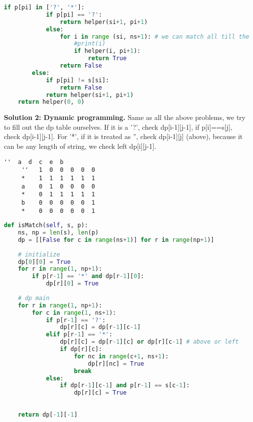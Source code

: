 \documentclass[../main.tex]{subfiles}
\begin{document}
\begin{examples}[resume]
\begin{lstlisting}[language=Python]
        if p[pi] in ['?', '*']: 
            if p[pi] == '?':
                return helper(si+1, pi+1)
            else:
                for i in range (si, ns+1): # we can match all till the end
                    #print(i)
                    if helper(i, pi+1):
                        return True
                return False
        else:
            if p[pi] != s[si]:
                return False
            return helper(si+1, pi+1)
    return helper(0, 0)
\end{lstlisting}

\textbf{Solution 2: Dynamic programming.} Same as all the above problems, we try to fill out the dp table ourselves. If it is a '?', check dp[i-1][j-1], if p[i]==s[j], check dp[i-1][j-1]. For '*', if it is treated as '', check dp[i-1][j] (above), because it can be any length of string, we check left dp[i][j-1].
\begin{lstlisting}[numbers=none]
         ''  a  d  c  e  b 
	 ''   1  0  0  0  0  0
	 *    1  1  1  1  1  1  
	 a    0  1  0  0  0  0
	 *    0  1  1  1  1  1
	 b    0  0  0  0  0  1
	 *    0  0  0  0  0  1
\end{lstlisting}
\begin{lstlisting}[language=Python]
def isMatch(self, s, p):
    ns, np = len(s), len(p)
    dp = [[False for c in range(ns+1)] for r in range(np+1)]
    
    # initialize
    dp[0][0] = True 
    for r in range(1, np+1):
        if p[r-1] == '*' and dp[r-1][0]:
            dp[r][0] = True
        
    # dp main
    for r in range(1, np+1):
        for c in range(1, ns+1):
            if p[r-1] == '?':
                dp[r][c] = dp[r-1][c-1]
            elif p[r-1] == '*':
                dp[r][c] = dp[r-1][c] or dp[r][c-1] # above or left
                if dp[r][c]:
                    for nc in range(c+1, ns+1):
                        dp[r][nc] = True
                    break
            else:
                if dp[r-1][c-1] and p[r-1] == s[c-1]:
                    dp[r][c] = True
                    
                    
    return dp[-1][-1]
\end{lstlisting}
\end{examples}
\end{document}
